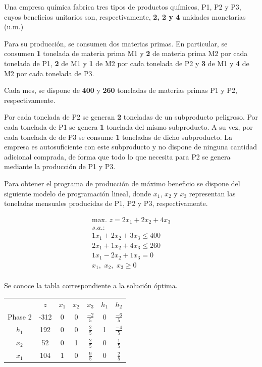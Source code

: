 Una empresa química fabrica tres tipos de productos químicos, P1, P2 y P3, cuyos beneficios unitarios son, respectivamente, \textbf{2, 2 y 4} unidades monetarias (u.m.) 

Para su producción, se consumen dos materias primas. En particular, se consumen \textbf{1} tonelada de materia prima M1 y \textbf{2} de materia prima M2 por cada tonelada de P1, \textbf{2} de M1 y \textbf{1} de M2 por cada tonelada de P2 y \textbf{3} de M1 y \textbf{4} de M2 por cada tonelada de P3.

Cada mes, se dispone de \textbf{400} y \textbf{260} toneladas de materias primas P1 y P2, respectivamente. 

Por cada tonelada de P2 se generan \textbf{2} toneladas de un subproducto peligroso. Por cada tonelada de P1 se genera \textbf{1} tonelada del mismo subproducto. A su vez, por cada tonelada de de P3 se consume \textbf{1} toneladas de dicho subproducto. La empresa es autosuficiente con este subproducto y no dispone de ninguna cantidad adicional comprada, de forma que todo lo que necesita para P2 se genera mediante la producción de P1 y P3.


Para obtener el programa de producción de máximo beneficio se dispone del siguiente modelo de programación lineal, donde $x_1$, $x_2$ y $x_3$ representan las toneladas mensuales producidas de P1, P2 y P3, respectivamente.
 
\begin{equation}
\begin{split}
\mbox{max. } z = 2x_1 + 2x_2 + 4x_3\\
s.a.:\\
1x_1 + 2x_2 + 3x_3 \leq 400\\
2x_1 + 1x_2 + 4x_3 \leq 260\\
1x_1 - 2x_2 + 1x_3 = 0\\
x_1,\,\,x_2,\,\,x_3\geq 0\\
\end{split}
\end{equation}

Se conoce la tabla correspondiente a la solución óptima.

\begin{center}
\begin{tabular}{c|c|ccccc|}
 & $z$ & $x_1$ & $x_2$ & $x_3$ & $h_1$ & $h_2$\\ 
Phase 2 & -312 & 0 & 0 & $\frac{-2}{5}$ & 0 & $\frac{-6}{5}$ \\ 
\hline
$h_1$ & 192  & 0 & 0 & $\frac{2}{5}$ & 1 & $\frac{-4}{5}$\\ 
$x_2$ & 52  & 0 & 1 & $\frac{2}{5}$ & 0 & $\frac{1}{5}$\\ 
$x_1$ & 104  & 1 & 0 & $\frac{9}{5}$ & 0 & $\frac{2}{5}$\\ 
\hline
\end{tabular}
\end{center}

